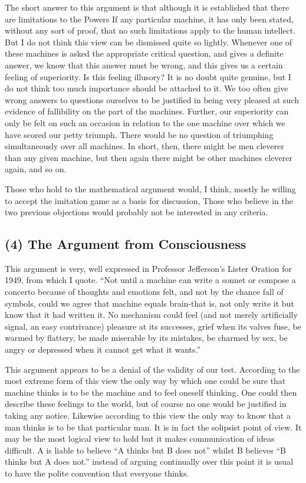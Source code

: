 \documentclass[10pt,twoside,openright]{memoir}
\begin{document}
The short answer to this argument is that although it is established that there are limitations to the Powers If any particular machine, it has only been stated, without any sort of proof, that no such limitations apply to the human intellect. But I do not think this view can be dismissed quite so lightly. Whenever one of these machines is asked the appropriate critical question, and gives a definite answer, we know that this answer must be wrong, and this gives us a certain feeling of superiority. Is this feeling illusory? It is no doubt quite genuine, but I do not think too much importance should be attached to it. We too often give wrong answers to questions ourselves to be justified in being very pleased
at such evidence of fallibility on the part of the machines. Further, our superiority can only be felt on such an occasion in relation to the one machine over which we have scored our petty triumph. There would be no question of triumphing simultaneously over all machines. In short, then, there might be men cleverer than any given machine, but then again there might be other machines cleverer again, and so on.

Those who hold to the mathematical argument would, I think, mostly he willing to accept the imitation game as a basis for discussion, Those who believe in the two previous objections would probably not be interested in any criteria.

\subsection{(4) The Argument from Consciousness}

This argument is very, well expressed in Professor Jefferson's Lister Oration for 1949, from which I quote. ``Not until a machine can write a sonnet or compose a concerto because of thoughts and emotions felt, and not by the chance fall of symbols, could we agree that machine equals brain-that is, not only write it but know that it had written it. No mechanism could feel (and not merely artificially signal, an easy contrivance) pleasure at its successes, grief when its valves fuse, be warmed by flattery, be made miserable by its mistakes, be charmed by sex, be angry or depressed when it cannot get what it wants.''

This argument appears to be a denial of the validity of our test. According to the most extreme form of this view the only way by which one could be sure that machine thinks is to be the machine and to feel oneself thinking. One could then describe these feelings to the world, but of course no one would be justified in taking any notice. Likewise according to this view the only way to know that a man thinks is to be that particular man. It is in fact the solipsist point of view. It may be the most logical view to hold but it makes communication of ideas difficult. A is liable to believe ``A thinks but B does not'' whilst B believes ``B thinks but A does not.'' instead of arguing continually over this point it is usual to have the polite convention that everyone thinks.
\end{document}
